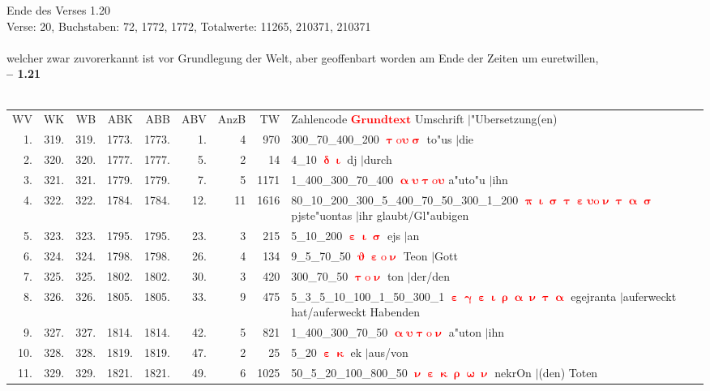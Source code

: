 \documentclass[a4paper,10pt,landscape]{article}
\begin{document}
Ende des Verses 1.20\\
Verse: 20, Buchstaben: 72, 1772, 1772, Totalwerte: 11265, 210371, 210371\\
\\
welcher zwar zuvorerkannt ist vor Grundlegung der Welt, aber geoffenbart worden am Ende der Zeiten um euretwillen,\\
\newpage 
{\bf -- 1.21}\\
\medskip \\
\begin{tabular}{rrrrrrrrp{120mm}}
WV&WK&WB&ABK&ABB&ABV&AnzB&TW&Zahlencode \textcolor{red}{$\boldsymbol{Grundtext}$} Umschrift $|$"Ubersetzung(en)\\
1.&319.&319.&1773.&1773.&1.&4&970&300\_70\_400\_200 \textcolor{red}{$\boldsymbol{\uptau\mathrm{o}\upsilon\upsigma}$} to"us $|$die\\
2.&320.&320.&1777.&1777.&5.&2&14&4\_10 \textcolor{red}{$\boldsymbol{\updelta\upiota}$} dj $|$durch\\
3.&321.&321.&1779.&1779.&7.&5&1171&1\_400\_300\_70\_400 \textcolor{red}{$\boldsymbol{\upalpha\upsilon\uptau\mathrm{o}\upsilon}$} a"uto"u $|$ihn\\
4.&322.&322.&1784.&1784.&12.&11&1616&80\_10\_200\_300\_5\_400\_70\_50\_300\_1\_200 \textcolor{red}{$\boldsymbol{\uppi\upiota\upsigma\uptau\upepsilon\upsilon\mathrm{o}\upnu\uptau\upalpha\upsigma}$} pjste"uontas $|$ihr glaubt/Gl"aubigen\\
5.&323.&323.&1795.&1795.&23.&3&215&5\_10\_200 \textcolor{red}{$\boldsymbol{\upepsilon\upiota\upsigma}$} ejs $|$an\\
6.&324.&324.&1798.&1798.&26.&4&134&9\_5\_70\_50 \textcolor{red}{$\boldsymbol{\upvartheta\upepsilon\mathrm{o}\upnu}$} Teon $|$Gott\\
7.&325.&325.&1802.&1802.&30.&3&420&300\_70\_50 \textcolor{red}{$\boldsymbol{\uptau\mathrm{o}\upnu}$} ton $|$der/den\\
8.&326.&326.&1805.&1805.&33.&9&475&5\_3\_5\_10\_100\_1\_50\_300\_1 \textcolor{red}{$\boldsymbol{\upepsilon\upgamma\upepsilon\upiota\uprho\upalpha\upnu\uptau\upalpha}$} egejranta $|$auferweckt hat/auferweckt Habenden\\
9.&327.&327.&1814.&1814.&42.&5&821&1\_400\_300\_70\_50 \textcolor{red}{$\boldsymbol{\upalpha\upsilon\uptau\mathrm{o}\upnu}$} a"uton $|$ihn\\
10.&328.&328.&1819.&1819.&47.&2&25&5\_20 \textcolor{red}{$\boldsymbol{\upepsilon\upkappa}$} ek $|$aus/von\\
11.&329.&329.&1821.&1821.&49.&6&1025&50\_5\_20\_100\_800\_50 \textcolor{red}{$\boldsymbol{\upnu\upepsilon\upkappa\uprho\upomega\upnu}$} nekrOn $|$(den) Toten\\

\end{tabular}
\end{document}
